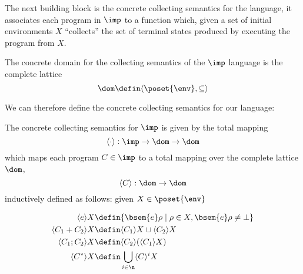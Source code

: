The next building block is the concrete collecting semantics for the
language, it associates each program in \(\imp\) to a function which,
given a set of initial environments \(X\) ``collects'' the set of
terminal states produced by executing the program from \(X\).

\begin{definition}
  The concrete domain for the collecting semantics of the \(\imp\)
  language is the complete lattice \[\dom \defin \langle \poset{\env}
  , \subseteq \rangle \]
\end{definition}

We can therefore define the concrete collecting semantics for our
language:

\begin{definition}
  The concrete collecting semantics for \(\imp\) is given by the total
  mapping \[\langle \cdot \rangle : \imp \to \dom \to \dom\] which
  maps each program \(C \in \imp\) to a total mapping over the
  complete lattice \(\dom\), \[\langle C \rangle : \dom \to \dom\]
  inductively defined as follows: given \(X \in \poset{\env}\)

  \begin{align*}
    \langle e \rangle X & \defin \{\bsem{ e} \rho \mid \rho \in X,
    \bsem{ e} \rho \neq \bot\} \\
    \langle C_1 + C_2 \rangle X & \defin \langle C_1 \rangle X \cup
    \langle C_2 \rangle X \\
    \langle C_1 ; C_2 \rangle X & \defin \langle C_2 \rangle (\langle
    C_1 \rangle X) \\
    \langle C^* \rangle X & \defin \bigcup_{i \in \n} \langle C \rangle^i X
  \end{align*}
\end{definition}


